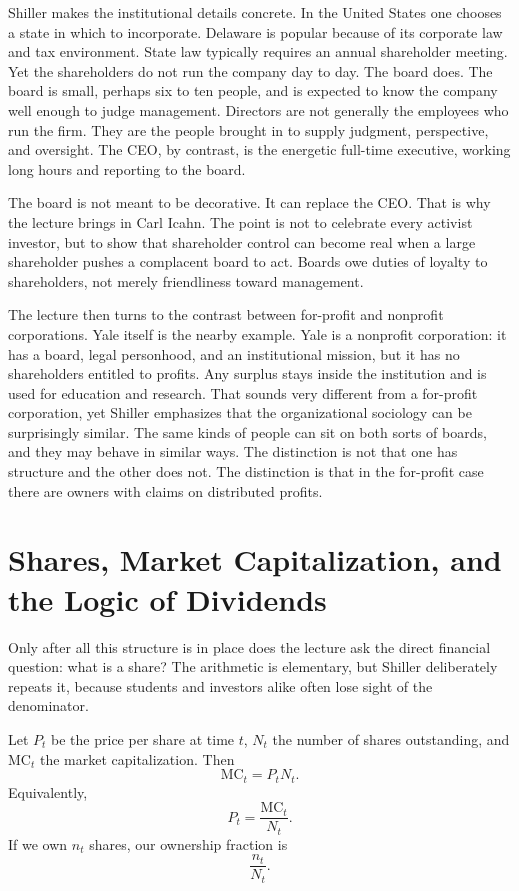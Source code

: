 Shiller makes the institutional details concrete. In the United States one chooses a state in which to incorporate. Delaware is popular because of its corporate law and tax environment. State law typically requires an annual shareholder meeting. Yet the shareholders do not run the company day to day. The board does. The board is small, perhaps six to ten people, and is expected to know the company well enough to judge management. Directors are not generally the employees who run the firm. They are the people brought in to supply judgment, perspective, and oversight. The CEO, by contrast, is the energetic full-time executive, working long hours and reporting to the board.

The board is not meant to be decorative. It can replace the CEO. That is why the lecture brings in Carl Icahn. The point is not to celebrate every activist investor, but to show that shareholder control can become real when a large shareholder pushes a complacent board to act. Boards owe duties of loyalty to shareholders, not merely friendliness toward management.

The lecture then turns to the contrast between for-profit and nonprofit corporations. Yale itself is the nearby example. Yale is a nonprofit corporation: it has a board, legal personhood, and an institutional mission, but it has no shareholders entitled to profits. Any surplus stays inside the institution and is used for education and research. That sounds very different from a for-profit corporation, yet Shiller emphasizes that the organizational sociology can be surprisingly similar. The same kinds of people can sit on both sorts of boards, and they may behave in similar ways. The distinction is not that one has structure and the other does not. The distinction is that in the for-profit case there are owners with claims on distributed profits.

\section{Shares, Market Capitalization, and the Logic of Dividends}

Only after all this structure is in place does the lecture ask the direct financial question: what is a share? The arithmetic is elementary, but Shiller deliberately repeats it, because students and investors alike often lose sight of the denominator.

Let $P_t$ be the price per share at time $t$, $N_t$ the number of shares outstanding, and $\mathrm{MC}_t$ the market capitalization. Then
\begin{equation}
\mathrm{MC}_t = P_t N_t.
\end{equation}
Equivalently,
\begin{equation}
P_t = \frac{\mathrm{MC}_t}{N_t}.
\end{equation}
If we own $n_t$ shares, our ownership fraction is
\begin{equation}
\frac{n_t}{N_t}.
\end{equation}

